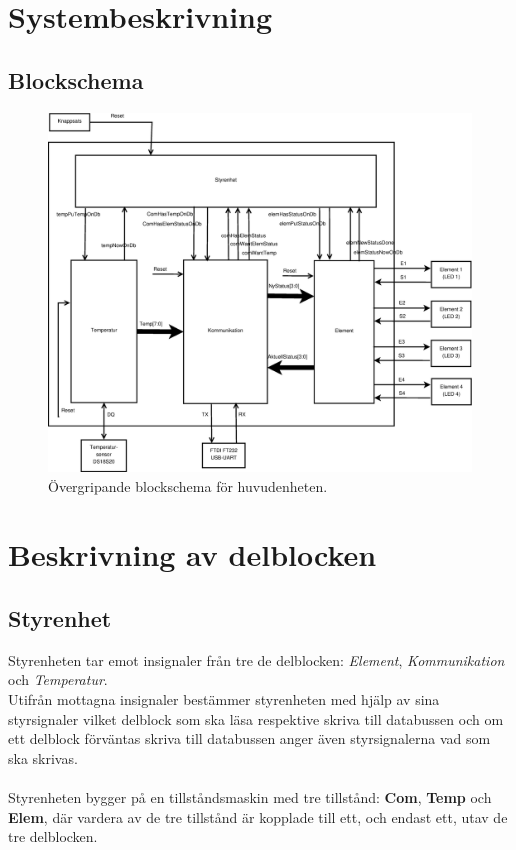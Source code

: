 \documentclass[a4paper]{scrartcl}
\begin{document}
\clearpage
\section{Systembeskrivning}

\subsection{Blockschema}
\begin{figure}[h!]
	\centering
	\advance\leftskip-3cm
	\advance\rightskip-3cm
	\includegraphics[width=15cm]{blockschema.eps}
	\caption{Övergripande blockschema för huvudenheten.}
\end{figure}


\clearpage
\section{Beskrivning av delblocken}

	\subsection{Styrenhet}
		Styrenheten tar emot insignaler från tre de delblocken: \emph{Element}, \emph{Kommunikation} och
		\emph{Temperatur}.
		\\
		Utifrån mottagna insignaler bestämmer styrenheten med hjälp av sina styrsignaler vilket delblock som ska läsa
		respektive skriva till databussen och om ett delblock förväntas skriva till databussen anger även styrsignalerna
		vad som ska skrivas. 
		\\\\
		Styrenheten bygger på en tillståndsmaskin med tre tillstånd: \textbf{Com}, \textbf{Temp} och \textbf{Elem}, där vardera
		av de tre tillstånd är kopplade till ett, och endast ett, utav de tre delblocken.
		
\end{document}

